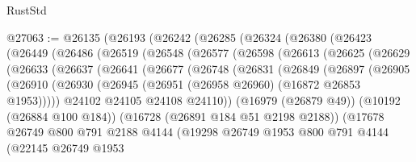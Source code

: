 \begin{lexlean}{RustStd}
\begin{coremodule}
@27063 := @26135
    (@26193
      (@26242
        (@26285
          (@26324
            (@26380
              (@26423
                (@26449
                  (@26486
                    (@26519
                      (@26548
                        (@26577
                          (@26598
                            (@26613
                              (@26625
                                (@26629
                                  (@26633
                                    (@26637
                                      (@26641
                                        (@26677
                                          (@26748
                                            (@26831
                                              (@26849
                                                (@26897
                                                  (@26905
                                                    (@26910
                                                      (@26930
                                                        (@26945
                                                          (@26951
                                                            (@26958 @26960)
                                                            (@16872 @26853 @1953)))))
                                                    @24102
                                                    @24105
                                                    @24108
                                                    @24110))
                                                (@16979 (@26879 @49))
                                                (@10192 (@26884 @100 @184))
                                                (@16728 (@26891 @184 @51 @2198 @2188))
                                                (@17678
                                                  @26749
                                                  @800
                                                  @791
                                                  @2188
                                                  @4144
                                                  (@19298
                                                    @26749
                                                    @1953
                                                    @800
                                                    @791
                                                    @4144
                                                    (@22145
                                                      @26749
                                                      @1953

\end{coremodule}
\end{lexlean}
